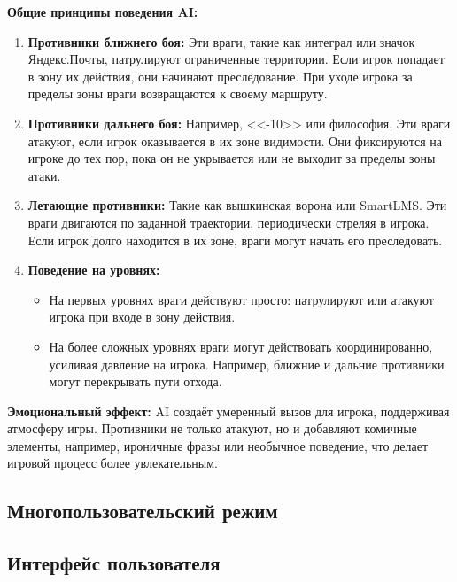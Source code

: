 \documentclass{article}
\begin{document}
\textbf{Общие принципы поведения AI:}

\begin{enumerate}
    \item \textbf{Противники ближнего боя:}  
    Эти враги, такие как интеграл или значок Яндекс.Почты, патрулируют ограниченные территории. Если игрок попадает в зону их действия, они начинают преследование. При уходе игрока за пределы зоны враги возвращаются к своему маршруту.  

    \item \textbf{Противники дальнего боя:}  
    Например, <<-10>> или философия. Эти враги атакуют, если игрок оказывается в их зоне видимости. Они фиксируются на игроке до тех пор, пока он не укрывается или не выходит за пределы зоны атаки.  

    \item \textbf{Летающие противники:}  
    Такие как вышкинская ворона или SmartLMS. Эти враги двигаются по заданной траектории, периодически стреляя в игрока. Если игрок долго находится в их зоне, враги могут начать его преследовать.  

    \item \textbf{Поведение на уровнях:}  
    \begin{itemize}
        \item На первых уровнях враги действуют просто: патрулируют или атакуют игрока при входе в зону действия.  
        \item На более сложных уровнях враги могут действовать координированно, усиливая давление на игрока. Например, ближние и дальние противники могут перекрывать пути отхода.  
    \end{itemize}
\end{enumerate}

\textbf{Эмоциональный эффект:}
    AI создаёт умеренный вызов для игрока, поддерживая атмосферу игры. Противники не только атакуют, но и добавляют комичные элементы, например, ироничные фразы или необычное поведение, что делает игровой процесс более увлекательным.
\subsection{Многопользовательский режим}

\subsection{Интерфейс пользователя}
\end{document}
